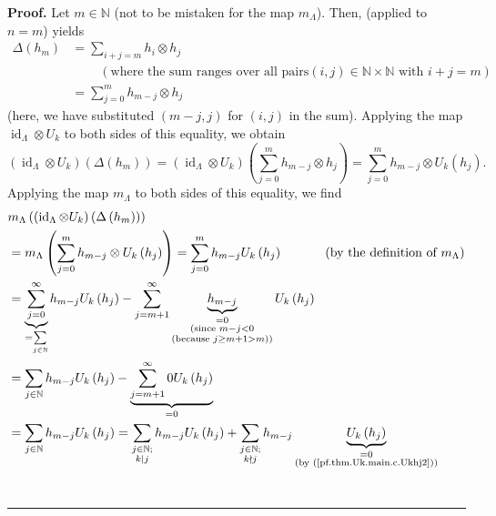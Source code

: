 \documentclass[numbers=enddot,12pt,final,onecolumn,notitlepage]{scrartcl}%
\theoremstyle{definition}
\newenvironment{proof}[1][Proof]{\noindent\textbf{#1.} }{\ \rule{0.5em}{0.5em}}
\let\sumnonlimits\sum
\renewcommand{\sum}{\sumnonlimits\limits}
\newenvironment{vershort}{}{}
\begin{document}
\begin{proof}
\begin{vershort}
Let $m\in\mathbb{N}$ (not to be mistaken for the map $m_{\Lambda}$). Then,
\cite[Proposition 2.3.6(iii)]{GriRei} (applied to $n=m$) yields
\begin{align*}
\Delta\left(  h_{m}\right)   &  =\sum_{i+j=m}h_{i}\otimes h_{j}\\
&  \ \ \ \ \ \ \ \ \ \ \left(  \text{where the sum ranges over all pairs
}\left(  i,j\right)  \in\mathbb{N}\times\mathbb{N}\text{ with }i+j=m\right) \\
&  =\sum_{j=0}^{m}h_{m-j}\otimes h_{j}%
\end{align*}
(here, we have substituted $\left(  m-j,j\right)  $ for $\left(  i,j\right)  $
in the sum). Applying the map $\operatorname*{id}\nolimits_{\Lambda}\otimes
U_{k}$ to both sides of this equality, we obtain%
\[
\left(  \operatorname*{id}\nolimits_{\Lambda}\otimes U_{k}\right)  \left(
\Delta\left(  h_{m}\right)  \right)  =\left(  \operatorname*{id}%
\nolimits_{\Lambda}\otimes U_{k}\right)  \left(  \sum_{j=0}^{m}h_{m-j}\otimes
h_{j}\right)  =\sum_{j=0}^{m}h_{m-j}\otimes U_{k}\left(  h_{j}\right)  .
\]
Applying the map $m_{\Lambda}$ to both sides of this equality, we find%
\begin{align*}
&  m_{\Lambda}\left(  \left(  \operatorname*{id}\nolimits_{\Lambda}\otimes
U_{k}\right)  \left(  \Delta\left(  h_{m}\right)  \right)  \right) \\
&  =m_{\Lambda}\left(  \sum_{j=0}^{m}h_{m-j}\otimes U_{k}\left(  h_{j}\right)
\right)  =\sum_{j=0}^{m}h_{m-j}U_{k}\left(  h_{j}\right)
\ \ \ \ \ \ \ \ \ \ \left(  \text{by the definition of }m_{\Lambda}\right) \\
&  =\underbrace{\sum_{j=0}^{\infty}}_{=\sum_{j\in\mathbb{N}}}h_{m-j}%
U_{k}\left(  h_{j}\right)  -\sum_{j=m+1}^{\infty}\underbrace{h_{m-j}%
}_{\substack{=0\\\text{(since }m-j<0\\\text{(because }j\geq m+1>m\text{))}%
}}U_{k}\left(  h_{j}\right) \\
&  =\sum_{j\in\mathbb{N}}h_{m-j}U_{k}\left(  h_{j}\right)  -\underbrace{\sum
_{j=m+1}^{\infty}0U_{k}\left(  h_{j}\right)  }_{=0}\\
&  =\sum_{j\in\mathbb{N}}h_{m-j}U_{k}\left(  h_{j}\right)  =\sum
_{\substack{j\in\mathbb{N};\\k\mid j}}h_{m-j}U_{k}\left(  h_{j}\right)
+\sum_{\substack{j\in\mathbb{N};\\k\nmid j}}h_{m-j}\underbrace{U_{k}\left(
h_{j}\right)  }_{\substack{=0\\\text{(by (\ref{pf.thm.Uk.main.c.Ukhj2}))}}}\\

\end{align*}
\end{vershort}
\end{proof}
\end{document}
